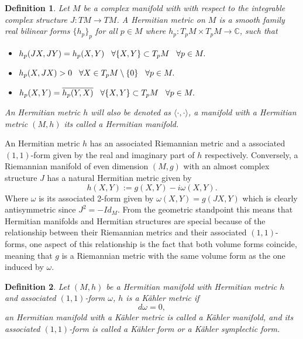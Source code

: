 \documentclass[12pt,twoside,a4paper]{report}
\newtheorem{definition}{Definition}[section]
\newcommand{\co}{\ensuremath{\mathbb C }}
\begin{document}
  \begin{definition}
          Let $M$ be a complex manifold with with respect to the integrable complex structure $J:TM\rightarrow TM$. A \textit{Hermitian metric} on $M$ is a smooth family real bilinear forms $\lbrace h_p\rbrace_p$ for all $p\in M$ where $h_p:T_pM\times T_pM\rightarrow\co$, such that
  \begin{itemize}
          \item $h_p(JX,JY)=h_p(X,Y)\hspace{0.3cm}\forall\lbrace X,Y\rbrace\subset T_pM\hspace{0.3cm}\forall p\in M.$
          \item $h_p(X,JX)>0\hspace{0.3cm}\forall X\in T_p M\setminus\lbrace 0\rbrace\hspace{0.3cm}\forall p\in M.$
          \item $h_p(X,Y)=\overline{h_p(Y,X)}\hspace{0.3cm}\forall\lbrace X,Y\rbrace\subset T_pM\hspace{0.3cm}\forall p\in M.$
  \end{itemize}
  An Hermitian metric $h$ will also be denoted as $\langle\cdot,\cdot\rangle$, a manifold with a Hermitian metric $(M,h)$ its called a \textit{Hermitian manifold}.
  \end{definition}
  An Hermitian metric $h$ has an associated Riemannian metric and a associated $(1,1)$-form given by the real and imaginary part of $h$ respectively. Conversely, a Riemannian manifold of even dimension $(M,g)$ with an almost complex structure $J$ has a natural Hermitian metric given by
  \[
    h(X,Y):=g(X,Y)-i\omega(X,Y).
  \]
  \noindent Where $\omega$ is its associated 2-form given by $\omega(X,Y)=g(JX,Y)$ which is clearly antisymmetric since $J^2=-Id_M$. From the geometric standpoint this means that Hermitian manifolds and Hermitian structures are special because of the relationship between their Riemannian metrics and their associated $(1,1)$-forms, one aspect of this relationship is the fact that both volume forms coincide, meaning that $g$ is a Riemannian metric with the same volume form as the one induced by $\omega$.

  \begin{definition}\label{Kahler-metric}
          Let $(M,h)$ be a Hermitian manifold with Hermitian metric $h$ and associated $(1,1)$-form $\omega$, $h$ is a Kähler metric if
          \[
            d\omega=0,
          \]
          \noindent an Hermitian manifold with a Kähler metric is called a \textit{Kähler manifold}, and its associated $(1,1)$-form is  called a \textit{Kähler form} or a \textit{Kähler symplectic form}.
  \end{definition}
\end{document}
